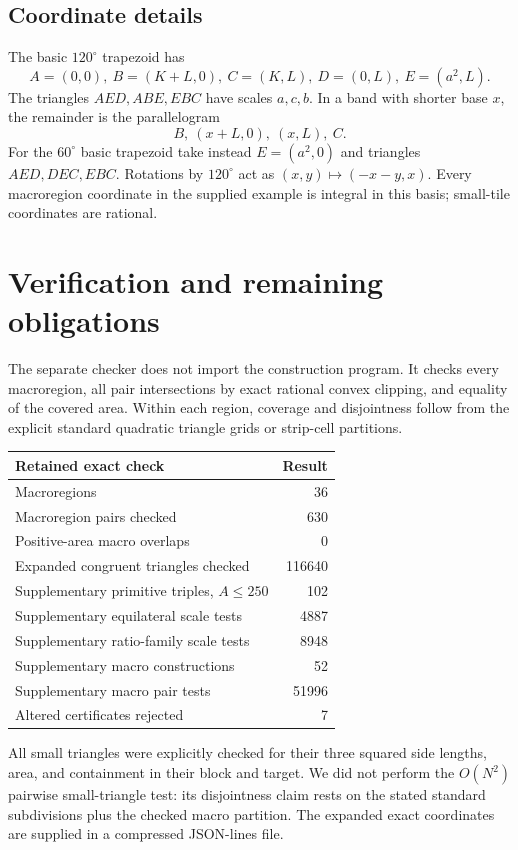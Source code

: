 \documentclass[11pt]{article}
\begin{document}
\subsection*{Coordinate details}
The basic $120^\circ$ trapezoid has
\[
 A=(0,0),\ B=(K+L,0),\ C=(K,L),\ D=(0,L),\ E=(a^2,L).
\]
The triangles $AED,ABE,EBC$ have scales $a,c,b$. In a band with shorter base $x$, the remainder is the parallelogram
\[
B,\ (x+L,0),\ (x,L),\ C.
\]
For the $60^\circ$ basic trapezoid take instead $E=(a^2,0)$ and triangles $AED,DEC,EBC$. Rotations by $120^\circ$ act as $(x,y)\mapsto(-x-y,x)$. Every macroregion coordinate in the supplied example is integral in this basis; small-tile coordinates are rational.

\section{Verification and remaining obligations}
The separate checker does not import the construction program. It checks every macroregion, all pair intersections by exact rational convex clipping, and equality of the covered area. Within each region, coverage and disjointness follow from the explicit standard quadratic triangle grids or strip-cell partitions.

\begin{center}
\begin{tabular}{lr}
\toprule
Retained exact check & Result\\
\midrule
Macroregions &36\\
Macroregion pairs checked &630\\
Positive-area macro overlaps &0\\
Expanded congruent triangles checked &116640\\
Supplementary primitive triples, $A\le250$ &102\\
Supplementary equilateral scale tests &4887\\
Supplementary ratio-family scale tests &8948\\
Supplementary macro constructions &52\\
Supplementary macro pair tests &51996\\
Altered certificates rejected &7\\
\bottomrule
\end{tabular}
\end{center}
All small triangles were explicitly checked for their three squared side lengths, area, and containment in their block and target. We did not perform the $O(N^2)$ pairwise small-triangle test: its disjointness claim rests on the stated standard subdivisions plus the checked macro partition. The expanded exact coordinates are supplied in a compressed JSON-lines file.
\end{document}
